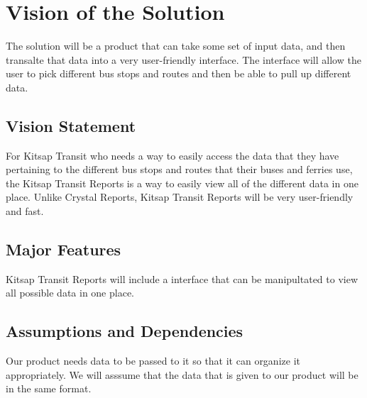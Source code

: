 \section{Vision of the Solution}

The solution will be a product that can take some set of input data, and then transalte that data into a very user-friendly interface. The interface will allow the user to pick different bus stops and routes and then be able to pull up different data.

\subsection{Vision Statement}
%

For Kitsap Transit who needs a way to easily access the data that they have pertaining to the different bus stops and routes that their buses and ferries use, the Kitsap Transit Reports is a way to easily view all of the different data in one place. Unlike Crystal Reports, Kitsap Transit Reports will be very user-friendly and fast.
  
\subsection{Major Features}

Kitsap Transit Reports will include a interface that can be manipultated to view all possible data in one place.

\subsection{Assumptions and Dependencies}

Our product needs data to be passed to it so that it can organize it appropriately. We will asssume that the data that is given to our product will be in the same format. 
